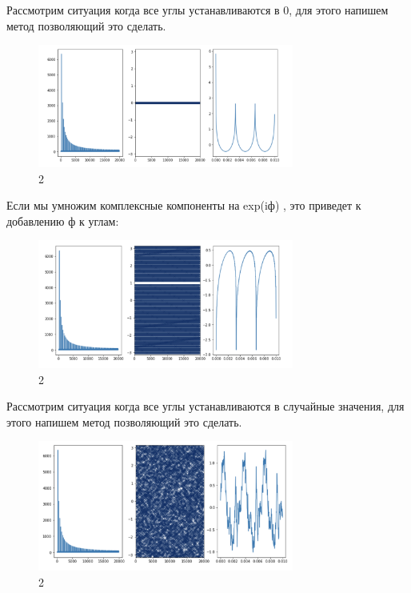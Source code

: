 \documentclass[10pt,a4paper,oneside]{article}
\begin{document}
Рассмотрим ситуация когда все углы устанавливаются в 0, для этого напишем метод позволяющий это сделать.

\begin{figure}[H]
        \centering
        \includegraphics[width=0.75\textwidth]{pics/16.png}
        \caption{2}
        \label{fig:first}
\end{figure}

Если мы умножим комплексные компоненты на exp(iф) , это приведет к добавлению ф к углам:

\begin{figure}[H]
        \centering
        \includegraphics[width=0.75\textwidth]{pics/17.png}
        \caption{2}
        \label{fig:first}
\end{figure}

Рассмотрим ситуация когда все углы устанавливаются в случайные значения, для этого напишем метод позволяющий это сделать.

\begin{figure}[H]
        \centering
        \includegraphics[width=0.75\textwidth]{pics/18.png}
        \caption{2}
        \label{fig:first}
\end{figure}
\end{document}
